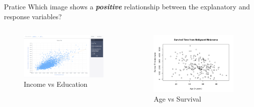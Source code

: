 \documentclass[
  ignorenonframetext,
]{beamer}
\begin{document}
\begin{frame}{Pratice}
\label{pratice}
Which image shows a \textbf{\emph{positive}} relationship between the
explanatory and response variables?

\begin{columns}[T]
\begin{column}{0.48\textwidth}
\begin{figure}[H]

{\centering \includegraphics{class31_files/mediabag/income-vs-college.png}

}

\caption{Income vs Education}

\end{figure}%
\end{column}

\begin{column}{0.48\textwidth}
\begin{figure}[H]

{\centering \includegraphics{class31_files/mediabag/age-vs-survival.png}

}

\caption{Age vs Survival}

\end{figure}%
\end{column}
\end{columns}
\end{frame}
\end{document}
